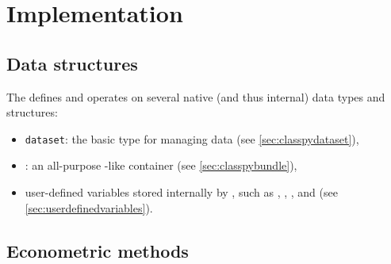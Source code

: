 \chapter{Implementation}\label{sec:implementation}


\section{Data structures}
The \lgretl defines and operates on several native (and thus internal) data types and structures:
\begin{itemize}
	\item \texttt{dataset}: the basic \lgretl type for
	managing data (see \ref{sec:classpydataset}),
	\item {}: an all-purpose -like
	container (see \ref{sec:classpybundle}),
	\item user-defined variables stored internally by \lgretl,
	such as , , ,
	and  (see \ref{sec:userdefinedvariables}).
\end{itemize}



\hansl

\section{Econometric methods}


